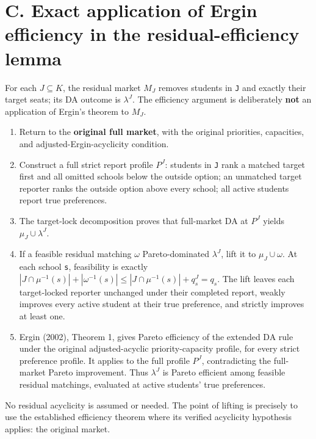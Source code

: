 \documentclass[a4paper,11pt]{article}
\begin{document}
\section*{C. Exact application of Ergin efficiency in the residual-efficiency lemma}
For each \ensuremath{J\subseteq{}K}, the residual market \ensuremath{M_J} removes students in \texttt{J} and exactly their target seats; its DA outcome is \ensuremath{\lambda^J}. The efficiency argument is deliberately \textbf{not} an application of Ergin's theorem to \ensuremath{M_J}.


\begin{enumerate}[leftmargin=*,itemsep=0.25em,topsep=0.25em]
\item Return to the \textbf{original full market}, with the original priorities, capacities, and adjusted-Ergin-acyclicity condition.
\item Construct a full strict report profile \ensuremath{P^J}: students in \texttt{J} rank a matched target first and all omitted schools below the outside option; an unmatched target reporter ranks the outside option above every school; all active students report true preferences.
\item The target-lock decomposition proves that full-market DA at \ensuremath{P^J} yields \ensuremath{\mu_J \cup{} \lambda^J}.
\item If a feasible residual matching \ensuremath{\omega} Pareto-dominated \ensuremath{\lambda^J}, lift it to \ensuremath{\mu_J \cup{} \omega}. At each school \texttt{s}, feasibility is exactly \ensuremath{|J\cap{}\mu^{-1}(s)| + |\omega^{-1}(s)| \leq{} |J\cap{}\mu^{-1}(s)| + q_s^J = q_s}. The lift leaves each target-locked reporter unchanged under their completed report, weakly improves every active student at their true preference, and strictly improves at least one.
\item Ergin (2002), Theorem 1, gives Pareto efficiency of the extended DA rule under the original adjusted-acyclic priority-capacity profile, for every strict preference profile. It applies to the full profile \ensuremath{P^J}, contradicting the full-market Pareto improvement. Thus \ensuremath{\lambda^J} is Pareto efficient among feasible residual matchings, evaluated at active students' true preferences.
\end{enumerate}


No residual acyclicity is assumed or needed. The point of lifting is precisely to use the established efficiency theorem where its verified acyclicity hypothesis applies: the original market.
\end{document}
